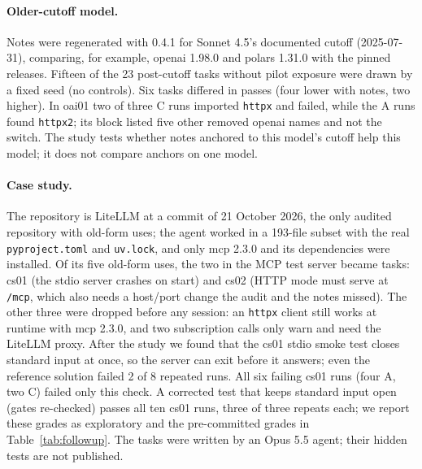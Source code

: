 \documentclass[11pt]{article}
\newcommand{\code}[1]{\texttt{#1}}
\begin{document}
\paragraph{Older-cutoff model.}
Notes were regenerated with 0.4.1 for Sonnet 4.5's documented cutoff (2025-07-31), comparing, for example, openai 1.98.0 and polars 1.31.0 with the pinned releases.
Fifteen of the 23 post-cutoff tasks without pilot exposure were drawn by a fixed seed (no controls).
Six tasks differed in passes (four lower with notes, two higher).
In oai01 two of three C runs imported \code{httpx} and failed, while the A runs found \code{httpx2}; its block listed five other removed openai names and not the switch.
The study tests whether notes anchored to this model's cutoff help this model; it does not compare anchors on one model.

\paragraph{Case study.}
The repository is LiteLLM at a commit of 21 October 2026, the only audited repository with old-form uses; the agent worked in a 193-file subset with the real \code{pyproject.toml} and \code{uv.lock}, and only mcp 2.3.0 and its dependencies were installed.
Of its five old-form uses, the two in the MCP test server became tasks: cs01 (the stdio server crashes on start) and cs02 (HTTP mode must serve at \code{/mcp}, which also needs a host/port change the audit and the notes missed).
The other three were dropped before any session: an \code{httpx} client still works at runtime with mcp 2.3.0, and two subscription calls only warn and need the LiteLLM proxy.
After the study we found that the cs01 stdio smoke test closes standard input at once, so the server can exit before it answers; even the reference solution failed 2 of 8 repeated runs.
All six failing cs01 runs (four A, two C) failed only this check.
A corrected test that keeps standard input open (gates re-checked) passes all ten cs01 runs, three of three repeats each; we report these grades as exploratory and the pre-committed grades in Table~\ref{tab:followup}.
The tasks were written by an Opus 5.5 agent; their hidden tests are not published.
\end{document}
